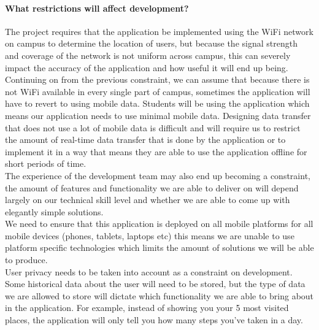\documentclass[a4paper,12pt]{article}
\begin{document}
\paragraph*{What restrictions will affect development?} 
The project requires that the application be implemented using the WiFi network on campus to determine the location of users, but because the signal strength and coverage of the network is not uniform across campus, this can severely impact the accuracy of the application and how useful it will end up being.
\\
Continuing on from the previous constraint, we can assume that because there is not WiFi available in every single part of campus, sometimes the application will have to revert to using mobile data. Students will be using the application which means our application needs to use minimal mobile data. Designing data transfer that does not use a lot of mobile data is difficult and will require us to restrict the amount of real-time data transfer that is done by the application or to implement it in a way that means they are able to use the application offline for short periods of time.  
\\
The experience of the development team may also end up becoming a constraint, the amount of features and functionality we are able to deliver on will depend largely on our technical skill level and whether we are able to come up with elegantly simple solutions.
\\
We need to ensure that this application is deployed on all mobile platforms for all mobile devices (phones, tablets, laptops etc) this means we are unable to use platform specific technologies which limits the amount of solutions we will be able to produce. 
\\
User privacy needs to be taken into account as a constraint on development. Some historical data about the user will need to be stored, but the type of data we are allowed to store will dictate which functionality we are able to bring about in the application. For example, instead of showing you your 5 most visited places, the application will only tell you how many steps you've taken in a day. 
\\
\end{document}
